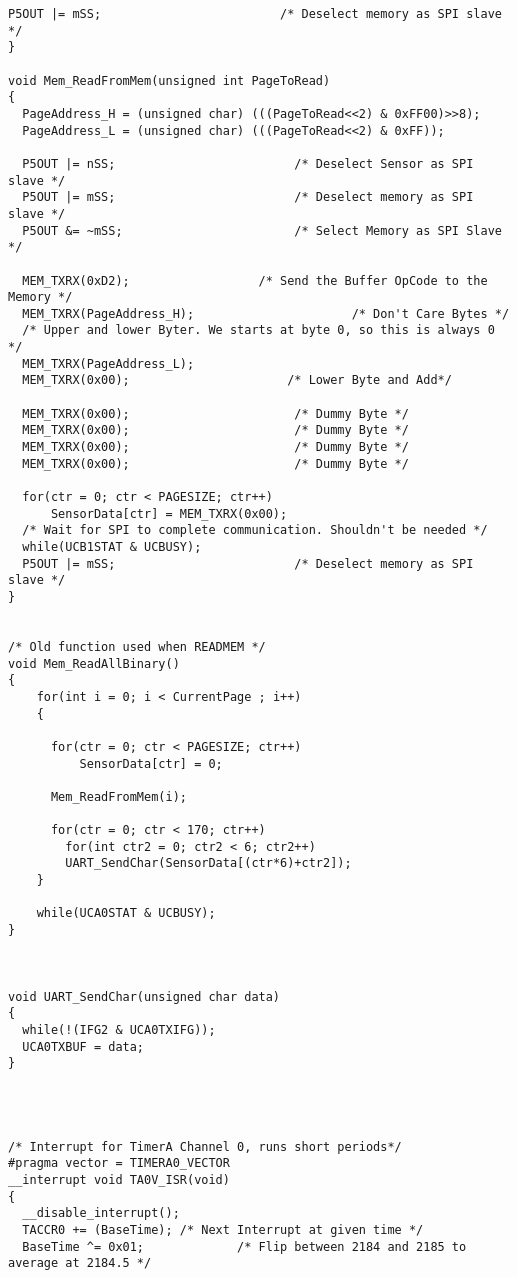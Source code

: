 \begin{lstlisting}[caption=Main.c,label=Code4]
  P5OUT |= mSS;                         /* Deselect memory as SPI slave */ 
}

void Mem_ReadFromMem(unsigned int PageToRead)
{
  PageAddress_H = (unsigned char) (((PageToRead<<2) & 0xFF00)>>8);
  PageAddress_L = (unsigned char) (((PageToRead<<2) & 0xFF));
  
  P5OUT |= nSS;                         /* Deselect Sensor as SPI slave */ 
  P5OUT |= mSS;                         /* Deselect memory as SPI slave */ 
  P5OUT &= ~mSS;                        /* Select Memory as SPI Slave */
  
  MEM_TXRX(0xD2);                  /* Send the Buffer OpCode to the Memory */
  MEM_TXRX(PageAddress_H);                      /* Don't Care Bytes */
  /* Upper and lower Byter. We starts at byte 0, so this is always 0 */
  MEM_TXRX(PageAddress_L);                      
  MEM_TXRX(0x00);                      /* Lower Byte and Add*/

  MEM_TXRX(0x00);                       /* Dummy Byte */
  MEM_TXRX(0x00);                       /* Dummy Byte */
  MEM_TXRX(0x00);                       /* Dummy Byte */
  MEM_TXRX(0x00);                       /* Dummy Byte */
  
  for(ctr = 0; ctr < PAGESIZE; ctr++)
      SensorData[ctr] = MEM_TXRX(0x00);
  /* Wait for SPI to complete communication. Shouldn't be needed */
  while(UCB1STAT & UCBUSY);             
  P5OUT |= mSS;                         /* Deselect memory as SPI slave */ 
}


/* Old function used when READMEM */
void Mem_ReadAllBinary()
{
    for(int i = 0; i < CurrentPage ; i++)
    {
      
      for(ctr = 0; ctr < PAGESIZE; ctr++)
          SensorData[ctr] = 0;
      
      Mem_ReadFromMem(i);
      
      for(ctr = 0; ctr < 170; ctr++)
        for(int ctr2 = 0; ctr2 < 6; ctr2++)
		UART_SendChar(SensorData[(ctr*6)+ctr2]);
    }
    
    while(UCA0STAT & UCBUSY);
}



void UART_SendChar(unsigned char data)
{ 
  while(!(IFG2 & UCA0TXIFG));
  UCA0TXBUF = data;  
}




/* Interrupt for TimerA Channel 0, runs short periods*/
#pragma vector = TIMERA0_VECTOR
__interrupt void TA0V_ISR(void)
{
  __disable_interrupt();
  TACCR0 += (BaseTime); /* Next Interrupt at given time */
  BaseTime ^= 0x01;             /* Flip between 2184 and 2185 to average at 2184.5 */
  

\end{lstlisting}
